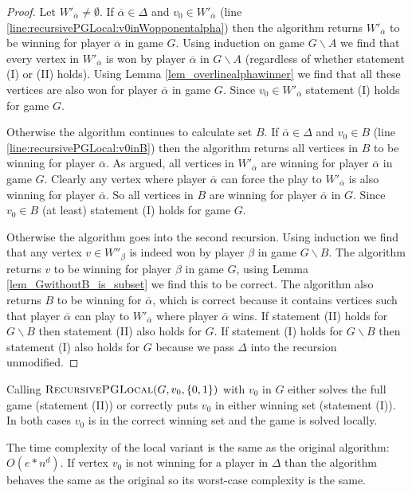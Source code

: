 \begin{theorem}
\begin{proof}
			Let $W'_{\overline{\alpha}} \neq \emptyset$. If $\overline{\alpha} \in \Delta$ and $v_0 \in W'_{\overline{\alpha}}$ (line \ref{line:recursivePGLocal:v0inWopponentalpha}) then the algorithm returns $W'_{\overline{\alpha}}$ to be winning for player $\overline{\alpha}$ in game $G$. Using induction on game $G \backslash A$ we find that every vertex in $W'_{\overline{\alpha}}$ is won by player $\overline{\alpha}$ in $G \backslash A$ (regardless of whether statement (I) or (II) holds). Using Lemma \ref{lem_overlinealphawinner} we find that all these vertices are also won for player $\overline{\alpha}$ in game $G$. Since $v_0 \in W'_{\overline{\alpha}}$ statement (I) holds for game $G$.
			
			Otherwise the algorithm continues to calculate set $B$. If $\overline{\alpha} \in \Delta$ and $v_0 \in B$ (line \ref{line:recursivePGLocal:v0inB}) then the algorithm returns all vertices in $B$ to be winning for player $\overline{\alpha}$. As argued, all vertices in $W'_{\overline{\alpha}}$ are winning for player $\overline{\alpha}$ in game $G$. Clearly any vertex where player $\overline{\alpha}$ can force the play to $W'_{\overline{\alpha}}$ is also winning for player $\overline{\alpha}$. So all vertices in $B$ are winning for player $\overline{\alpha}$ in $G$. Since $v_0 \in B$ (at least) statement (I) holds for game $G$.
			
			Otherwise the algorithm goes into the second recursion. Using induction we find that any vertex $v \in W''_\beta$ is indeed won by player $\beta$ in game $G\backslash B$. The algorithm returns $v$ to be winning for player $\beta$ in game $G$, using Lemma \ref{lem_GwithoutB_is_subset} we find this to be correct. The algorithm also returns $B$ to be winning for $\overline{\alpha}$, which is correct because it contains vertices such that player $\overline{\alpha}$ can play to $W'_{\overline{\alpha}}$ where player $\overline{\alpha}$ wins. If statement (II) holds for $G\backslash B$ then statement (II) also holds for $G$. If statement (I) holds for $G\backslash B$ then statement (I) also holds for $G$ because we pass $\Delta$ into the recursion unmodified.
		\end{proof}
\end{theorem}
Calling $\textsc{RecursivePGLocal}(G, v_0, \{0,1\})$ with $v_0$ in $G$ either solves the full game (statement (II)) or correctly puts $v_0$ in either winning set (statement (I)). In both cases $v_0$ is in the correct winning set and the game is solved locally.

The time complexity of the local variant is the same as the original algorithm: $O(e*n^d)$. If vertex $v_0$ is not winning for a player in $\Delta$ than the algorithm behaves the same as the original so its worst-case complexity is the same.


